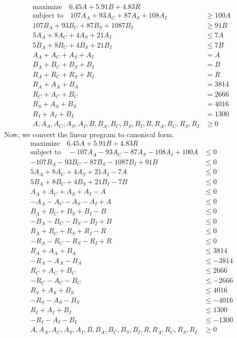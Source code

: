 \documentclass[12pt]{article}
\begin{document}
\begin{align*}
\text{maximize} \quad 6.45 A + 5.91 B + 4.83 R & \\
\text{subject to} \quad 107 A_A + 93 A_C + 87 A_S + 108 A_I &\geq 100 A \\
107 B_A + 93 B_C + 87 B_S + 1087 B_I &\geq 91 B \\
5 A_A + 8 A_C + 4 A_S + 21 A_I &\leq 7 A \\
5 B_A + 8 B_C + 4 B_S + 21 B_I &\leq 7 B \\
A_A + A_C + A_S + A_I &= A \\
B_A + B_C + B_S + B_I &= B \\
R_A + R_C + R_S + R_I &= R \\
R_A + A_A + B_A &= 3814 \\
R_C + A_C + B_C &= 2666 \\
R_S + A_S + B_S &= 4016 \\
R_I + A_I + B_I &= 1300 \\
A, A_A, A_C, A_S, A_I, B, B_A, B_C, B_S, B_I, R, R_A, R_C, R_S, R_I &\geq 0
\end{align*}
Now, we convert the linear program to canonical form.
\begin{align*}
\text{maximize} \quad 6.45 A + 5.91 B + 4.83 R & \\
\text{subject to} \quad -107 A_A - 93 A_C - 87 A_S - 108 A_I + 100 A &\leq 0 \\
-107 B_A - 93 B_C - 87 B_S - 1087 B_I + 91 B &\leq 0 \\
5 A_A + 8 A_C + 4 A_S + 21 A_I - 7A &\leq 0 \\
5 B_A + 8 B_C + 4 B_S + 21 B_I - 7B &\leq 0 \\
A_A + A_C + A_S + A_I - A &\leq 0 \\
-A_A - A_C - A_S - A_I + A &\leq 0 \\
B_A + B_C + B_S + B_I - B &\leq 0 \\
-B_A - B_C - B_S - B_I + B &\leq 0 \\
R_A + R_C + R_S + R_I - R &\leq 0 \\
-R_A - R_C - R_S - R_I + R &\leq 0 \\
R_A + A_A + B_A &\leq 3814 \\
-R_A - A_A - B_A &\leq -3814 \\
R_C + A_C + B_C &\leq 2666 \\
-R_C - A_C - B_C &\leq -2666 \\
R_S + A_S + B_S &\leq 4016 \\
-R_S - A_S - B_S &\leq -4016 \\
R_I + A_I + B_I &\leq 1300 \\
-R_I - A_I - B_I &\leq -1300 \\
A, A_A, A_C, A_S, A_I, B, B_A, B_C, B_S, B_I, R, R_A, R_C, R_S, R_I &\geq 0
\end{align*}
\end{document}
